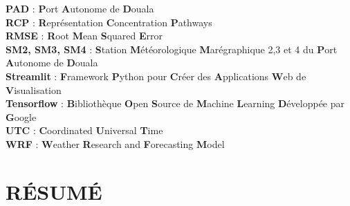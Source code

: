 \documentclass[a4paper,12pt,openany]{report}
\begin{document}
\begin{flushleft}
\textbf{PAD} : \textbf{P}ort \textbf{A}utonome de \textbf{D}ouala\\
\textbf{RCP} : \textbf{R}eprésentation \textbf{C}oncentration \textbf{P}athways\\
\textbf{RMSE} : \textbf{R}oot \textbf{M}ean \textbf{S}quared \textbf{E}rror\\
\textbf{SM2, SM3, SM4} : \textbf{S}tation \textbf{M}étéorologique \textbf{M}arégraphique 2,3 et 4 du \textbf{P}ort \textbf{A}utonome de \textbf{D}ouala\\
\textbf{Streamlit} : \textbf{F}ramework \textbf{P}ython pour \textbf{C}réer des \textbf{A}pplications \textbf{W}eb de \textbf{V}isualisation\\
\textbf{Tensorflow} : \textbf{B}ibliothèque \textbf{O}pen \textbf{S}ource de \textbf{M}achine \textbf{L}earning \textbf{D}éveloppée par \textbf{G}oogle\\
\textbf{UTC} : \textbf{C}oordinated \textbf{U}niversal \textbf{T}ime\\
\textbf{WRF} : \textbf{W}eather \textbf{R}esearch and \textbf{F}orecasting \textbf{M}odel\\
	\end{flushleft}


\chapter*{RÉSUMÉ} %
	\label{ch:abstract}
\end{document}
